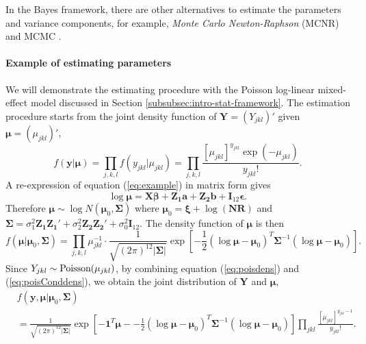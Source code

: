 In the Bayes framework, there are other alternatives to estimate the parameters and variance
components, for example,  \textit{Monte Carlo Newton-Raphson} (MCNR) \citep{mcculloch1997maximum} and  MCMC \citep{hadfield2010mcmc}.

\paragraph{Example of estimating parameters}
We will demonstrate the estimating procedure with the Poisson log-linear mixed-effect model
discussed in Section \ref{subsubsec:intro-stat-framework}.
The estimation procedure starts from the joint density function of $\bm Y=(Y_{jkl})'$ given $\bm
\mu= (\mu_{jkl})'$,
\begin{equation}\label{eq:poisdens}
	f(\bm y|\bm \mu )=\prod_{ j,
		k,l}f(y_{jkl}|\mu_{jkl})=\prod_{j,k,l}\frac{[\mu_{jkl}]^{y_{jkl}}\exp(-\mu_{jkl})}{y_{jkl}!}.
\end{equation}
A re-expression of  equation (\ref{eq:example}) in matrix form gives 
\[\log\bm \mu= \bm {X\beta} + \bm {Z_1 a} + \bm{Z_2b} + \bm I_{12}\bm \epsilon. \]
Therefore  $\bm\mu  \sim \log N(\bm \mu_0, \bm \Sigma)$ where $\bm \mu_0 =\bm\xi + \log(\bm {NR})$
and $\bm \Sigma = \sigma_1^2\bm {Z_1Z_1'} + \sigma_2^2\bm {Z_2 Z_2'} +\sigma_0^2 \bm I_{12}$.
The density function of $\bm \mu$ is then
\begin{equation}\label{eq:poisConddens}
	f(\bm \mu |\bm \mu_0, \bm \Sigma)=\prod_{j,k,l} \mu_{jkl}^{-1}\cdot \frac{1}{
		\sqrt{(2\pi)^{12}|\bm\Sigma|}}\exp[-\frac{1}{2} {(\log\bm \mu - \bm \mu_0)^T\bm \Sigma^{-1}(\log\bm
		\mu - \bm \mu_0)}].
\end{equation}
Since $Y_{jkl}\sim \text{Poisson} (\mu_{jkl})$, by combining equation (\ref{eq:poisdens}) and
(\ref{eq:poisConddens}), we obtain the joint distribution of $\bm Y$ and $\bm \mu$,
\begin{equation}
\begin{aligned}
&f(\bm y, \bm \mu |\bm \mu_0, \bm \Sigma) \\
& =\frac{1}{\sqrt{(2\pi)^{12}|\bm \Sigma|}}\exp[-\bm
1^T\bm \mu - -\frac{1}{2} {(\log\bm \mu - \bm \mu_0)^T\bm \Sigma^{-1}(\log\bm \mu - \bm
	\mu_0)}]\prod_{jkl}\frac{[\mu_{jkl}]^{y_{jkl}-1}}{y_{jkl}!}.
\end{aligned}
\end{equation}

